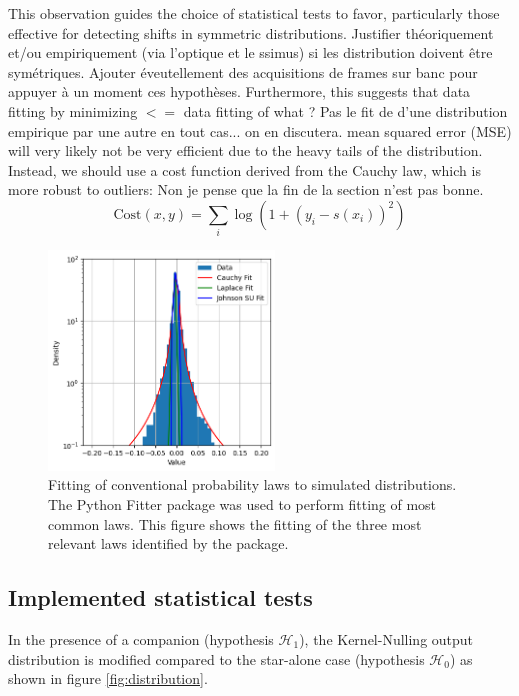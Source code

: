 \documentclass{article}
\newcommand{\dm}[1]{{\color{mulberry} #1}}
\begin{document}
This observation guides the choice of statistical tests to favor, particularly those effective for detecting shifts in symmetric distributions.\dm{Justifier théoriquement et/ou empiriquement (via l'optique et le ssimus) si les distribution doivent être symétriques. Ajouter éveutellement des acquisitions de frames sur banc pour appuyer à un moment ces hypothèses. } Furthermore, this suggests that data fitting by minimizing \dm{$<=$ data fitting of what ? Pas le fit de d'une distribution empirique par une autre en tout cas... on en discutera. } mean squared error (MSE) will very likely not be very efficient due to the heavy tails of the distribution. Instead, we should use a cost function derived from the Cauchy law, which is more robust to outliers:\dm{Non je pense que la fin de la section n'est pas bonne.}
\begin{equation}
    \text{Cost}(x, y) = \sum_i \log \left( 1 + \left( y_i - s(x_i )\right)^2 \right)
\end{equation}

\begin{figure}[H]
\centering
\includegraphics[width=6cm]{img/fits.png}
\caption{Fitting of conventional probability laws to simulated distributions. The Python Fitter package was used to perform fitting of most common laws. This figure shows the fitting of the three most relevant laws identified by the package.}
\label{fig:fits}
\end{figure}



\subsection{Implemented statistical tests}

In the presence of a companion (hypothesis $\mathcal{H}_1$), the Kernel-Nulling output distribution is modified compared to the star-alone case (hypothesis $\mathcal{H}_0$) as shown in figure \ref{fig:distribution}.
\end{document}

